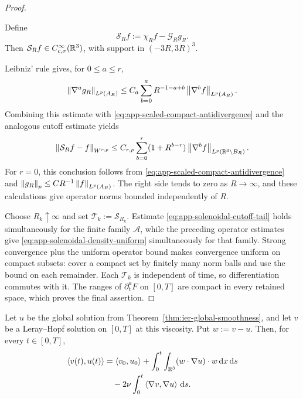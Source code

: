 \begin{proof}
\begin{samepage}
Define
\[
 \mathcal S_Rf:=\chi_Rf-\mathcal G_Rg_R.
\]
Then \(\mathcal S_Rf\in C_{c,\sigma}^\infty(\mathbb R^3)\), with support in
\((-3R,3R)^3\).
\end{samepage}
Leibniz' rule gives, for \(0\le a\le r\),
\[
 \left\lVert \nabla^ag_R\right\rVert_{L^p(A_R)}
 \le C_a\sum_{b=0}^{a}
 R^{-1-a+b}\left\lVert \nabla^bf\right\rVert_{L^p(A_R)}.
\]
Combining this estimate with
\eqref{eq:app-scaled-compact-antidivergence} and the analogous cutoff
estimate yields
\begin{equation}
 \left\lVert \mathcal S_Rf-f\right\rVert_{W^{r,p}}
 \le C_{r,p}\sum_{b=0}^{r}
 (1+R^{b-r})\left\lVert \nabla^bf\right\rVert_{L^p(\mathbb R^3\setminus B_R)}.
 \label{eq:app-solenoidal-cutoff-tail}
\end{equation}
For \(r=0\), this conclusion follows from
\eqref{eq:app-scaled-compact-antidivergence} and
\(\left\lVert g_R\right\rVert_p\le C R^{-1}\left\lVert f\right\rVert_{L^p(A_R)}\).
The right side tends to zero as \(R\to\infty\), and these calculations
give operator norms bounded independently of \(R\).

Choose \(R_k\uparrow\infty\) and set
\(\mathcal T_k:=\mathcal S_{R_k}\).  Estimate
\eqref{eq:app-solenoidal-cutoff-tail} holds simultaneously for the finite
family \(\mathscr A\), while the preceding operator estimates give
\eqref{eq:app-solenoidal-density-uniform} simultaneously for that family.
Strong convergence plus the uniform operator bound makes convergence
uniform on compact subsets: cover a compact set by finitely many norm balls
and use the bound on each remainder.  Each \(\mathcal T_k\) is independent
of time, so differentiation commutes with it.  The ranges of
\(\partial_t^aF\) on \([0,T]\) are compact in every retained space, which
proves the final assertion.
\end{proof}

\begin{lemma}
\label{lem:app-cross-energy}
Let \(u\) be the global solution from
Theorem~\ref{thm:ier-global-smoothness}, and let \(v\) be a Leray--Hopf
solution on \([0,T]\) at this viscosity.  Put \(w:=v-u\).  Then, for every
\(t\in[0,T]\),
\begin{align}
 \left\langle v(t),u(t)\right\rangle
 &=
 \left\langle v_0,u_0\right\rangle
 +\int_0^t\int_{\mathbb R^3}
       (w\cdot\nabla u)\cdot w\,\mathrm d x\,\mathrm d s
 \notag\\
 &\quad
 -2\nu\int_0^t\left\langle \nabla v,\nabla u\right\rangle\,\mathrm d s.
 \label{eq:app-cross-energy}
\end{align}
\end{lemma}

